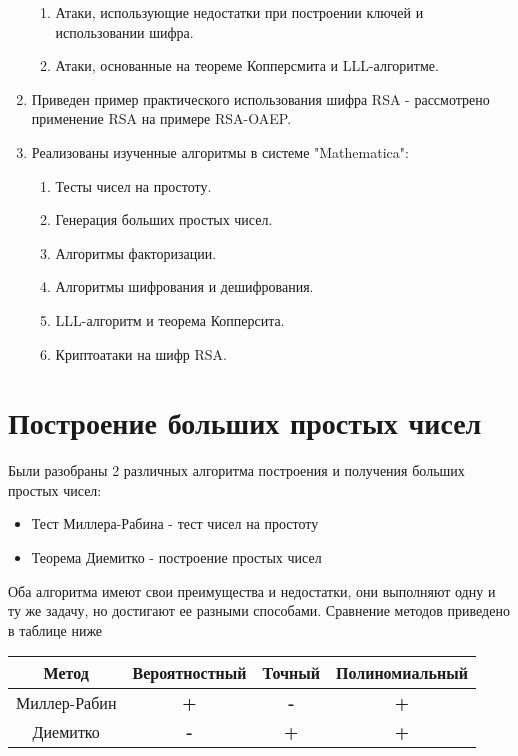 \begin{enumerate}
      	\begin{enumerate}
      		\item Атаки, использующие недостатки при построении ключей и использовании шифра.
      		\item Атаки, основанные на теореме Копперсмита и LLL-алгоритме.    
      	\end{enumerate}
      \item Приведен пример практического использования шифра RSA - рассмотрено применение RSA на примере RSA-OAEP.      
      \item Реализованы изученные алгоритмы в системе "Mathematica":
      	\begin{enumerate}
          \item Тесты чисел на простоту.
          \item Генерация больших простых чисел.
          \item Алгоритмы факторизации.
          \item Алгоритмы шифрования и дешифрования.
          \item LLL-алгоритм и теорема Копперсита.
          \item Криптоатаки на шифр RSA.
        \end{enumerate}
\end{enumerate}

\section*{Построение больших простых чисел}
	Были разобраны 2 различных алгоритма построения и получения больших простых чисел:
		\begin{itemize}
			\item Тест Миллера-Рабина - тест чисел на простоту 
			\item Теорема Диемитко - построение простых чисел        
		\end{itemize}

	Оба алгоритма имеют свои преимущества и недостатки, они выполняют одну и ту же задачу, но достигают ее разными способами. Сравнение методов 
	приведено в таблице ниже

	\begin{table}[h]
		\centering	
		\begin{tabular}{|c|c|c|c|}	
			\hline  		     
		    \textbf{Метод} & \textbf{Вероятностный} & \textbf{Точный} & \textbf{Полиномиальный} \\ \hline		    
		    Миллер-Рабин        & \textbf{+}           & \textbf{-}                & \textbf{+}             \\ \hline
		    Диемитко            & \textbf{-}           & \textbf{+}                & \textbf{+}             \\	\hline	  		    
		\end{tabular} 
	\end{table}


